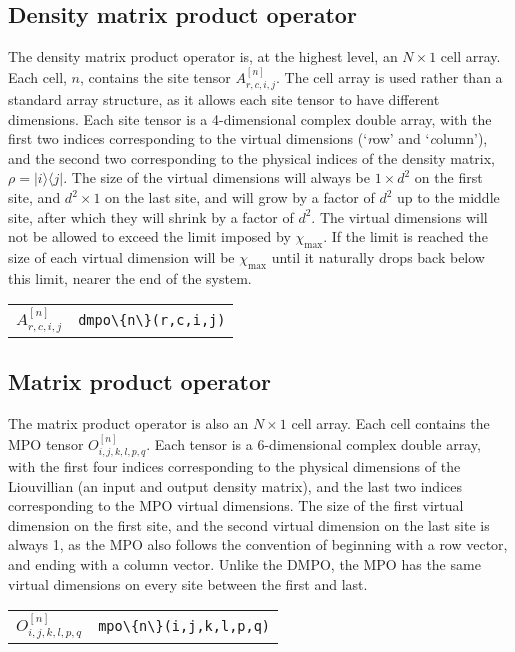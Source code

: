  \subsection{Density matrix product operator}
 The density matrix product operator is, at the highest level, an \(N \times 1\) cell array. Each cell, \(n\), contains the site tensor \(A^{[n]}_{r,c,i,j}\). The cell array is used rather than a standard array structure, as it allows each site tensor to have different dimensions. Each site tensor is a 4-dimensional complex double array, with the first two indices corresponding to the virtual dimensions (`\emph{r}ow' and `\emph{c}olumn'), and the second two corresponding to the physical indices of the density matrix, \(\rho = |i \rangle \langle j|\). The size of the virtual dimensions will always be \(1 \times d^{2}\) on the first site, and \(d^{2} \times 1\) on the last site, and will grow by a factor of \(d^{2}\) up to the middle site, after which they will shrink by a factor of \(d^{2}\). The virtual dimensions will not be allowed to exceed the limit imposed by \(\chi_{\mathrm{max}}\). If the limit is reached the size of each virtual dimension will be \(\chi_{\mathrm{max}}\) until it naturally drops back below this limit, nearer the end of the system.

 \begin{tabu} to \linewidth {X[c]|X[c]}
  	\(A^{[n]}_{r,c,i,j}\) & \lstinline$dmpo\{n\}(r,c,i,j)$
 \end{tabu}

\subsection{Matrix product operator}
The matrix product operator is also an \(N \times 1\) cell array. Each cell contains the MPO tensor \(O^{[n]}_{i,j,k,l,p,q}\). Each tensor is a 6-dimensional complex double array, with the first four indices corresponding to the physical dimensions of the Liouvillian (an input and output density matrix), and the last two indices corresponding to the MPO virtual dimensions. The size of the first virtual dimension on the first site, and the second virtual dimension on the last site is always 1, as the MPO also follows the convention of beginning with a row vector, and ending with a column vector. Unlike the DMPO, the MPO has the same virtual dimensions on every site between the first and last.

 \begin{tabu} to \linewidth {X[c]|X[c]}
  	\(O^{[n]}_{i,j,k,l,p,q}\) & \lstinline$mpo\{n\}(i,j,k,l,p,q)$
 \end{tabu}

